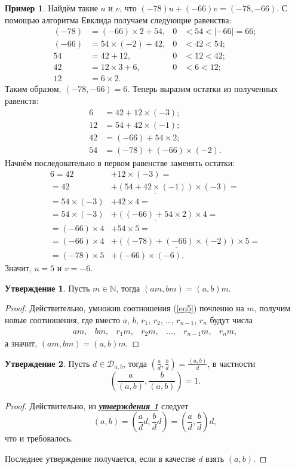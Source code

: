 \documentclass[14pt, a4paper]{extarticle}
\theoremstyle{definition}
\newtheorem{example}{Пример}
\newtheorem{statement}{Утверждение}
\begin{document}
	\begin{example}
		Найдём такие $u$ и $v$, что $(-78)u+(-66)v=(-78,-66)$. С помощью алгоритма Евклида получаем следующие равенства:
		\begin{align*}
				(-78)&=(-66)\times2+54,&0&<54<|-66|=66;\\
				(-66)&=54\times(-2)+42,&0&<42<54;\\
				54&=42+12,&0&<12<42;\\
				42&=12\times3+6,&0&<6<12;\\
				12&=6\times2.
		\end{align*}
		Таким образом, $(-78,-66)=6$. Теперь выразим остатки из полученных равенств:
		\begin{align*}
			6&=42+12\times(-3);\\
			12&=54+42\times(-1);\\
			42&=(-66)+54\times2;\\
			54&=(-78)+(-66)\times(-2).
		\end{align*}
		Начнём последовательно в первом равенстве заменять остатки:
		\begin{align*}
			6=42&+\boxed{12}\times(-3)=\\
			=42&+\underline{(54+42\times(-1))}\times(-3)=\\
			=54\times(-3)&+\boxed{42}\times4=\\
			=54\times(-3)&+\underline{((-66)+54\times2)}\times4=\\
			=(-66)\times4&+\boxed{54}\times5=\\
			=(-66)\times4&+\underline{((-78)+(-66)\times(-2))}\times5=\\
			=\boxed{(-78)}\times5&+\boxed{(-66)}\times(-6).
		\end{align*}
		Значит, $u=5$ и $v=-6$.
	\end{example}

	\begin{statement}
	\label{vyn}
		Пусть $m\in\mathbb{N}$, тогда $(am,bm)=(a,b)m$.
	\end{statement}
	\begin{proof}
		Действительно, умножив соотношения (\ref{eq5}) почленно на $m$, получим новые соотношения, где вместо $a$, $b$, $r_1$, $r_2$, \dots, $r_{n-1}$, $r_n$ будут числа
		$$\begin{array}{ccccccc}
			am,&bm,&r_1m,&r_2m,&\dots,&r_{n-1}m,&r_nm,
		\end{array}$$
		а значит, $(am,bm)=(a,b)m$.
	\end{proof}

	\begin{statement}
	\label{delpr}
		Пусть $d\in\mathcal{D}_{a,b}$, тогда $\left(\frac{a}{d},\frac{b}{d}\right)=\frac{(a,b)}{d}$, в частности $$\boxed{\left(\frac{a}{(a,b)},\frac{b}{(a,b)}\right)=1.}$$
	\end{statement}
	\begin{proof}
		Действительно, из \hyperref[vyn]{\textbf{\textit{утверждения \ref*{vyn}}}} следует $$(a,b)=\left(\frac{a}{d}d,\frac{b}{d}d\right)=\left(\frac{a}{d},\frac{b}{d}\right)d,$$ что и требовалось.
		
		Последнее утверждение получается, если в качестве $d$ взять $(a,b)$.
	\end{proof}
\end{document}
